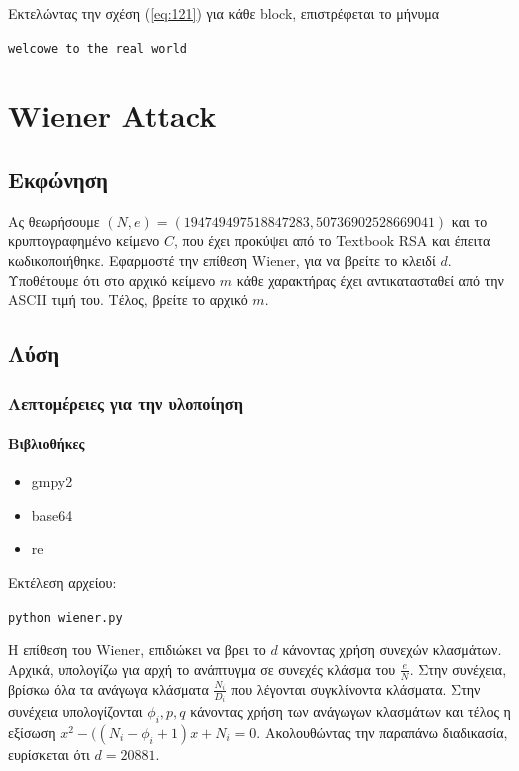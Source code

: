 \documentclass[oneside]{article}
\let\t\texttt
\begin{document}
Εκτελώντας την σχέση (\ref{eq:121}) για κάθε block, επιστρέφεται το μήνυμα

\begin{center}
    \t{welcowe to the real world}
\end{center}

\section{Wiener Attack}

\subsection{Εκφώνηση} 

Ας θεωρήσουμε $(N, e) = (194749497518847283, 50736902528669041)$ και το κρυπτογραφημένο κείμενο \href{https://github.com/drazioti/book_crypto/blob/master/public_key_crypto/7.2}{$C$}, που έχει προκύψει από το Textbook RSA και έπειτα κωδικοποιήθηκε. Εφαρμοστέ την επίθεση Wiener, για να βρείτε το κλειδί $d$. Υποθέτουμε ότι στο αρχικό κείμενο $m$ κάθε χαρακτήρας έχει αντικατασταθεί από την ASCII τιμή του. Τέλος, βρείτε το αρχικό $m$.

\subsection{Λύση}

\subsubsection{Λεπτομέρειες για την υλοποίηση}

\paragraph{Βιβλιοθήκες}

\begin{itemize}
    \item gmpy2
    \item base64
    \item re
\end{itemize}

Εκτέλεση αρχείου:

\begin{center}
    \t{python wiener.py}
\end{center}

Η επίθεση του Wiener, επιδιώκει να βρει το $d$ κάνοντας χρήση συνεχών κλασμάτων. 
Αρχικά, υπολογίζω για αρχή το ανάπτυγμα σε συνεχές κλάσμα του $\frac{e}{N}$. Στην συνέχεια, βρίσκω όλα τα ανάγωγα κλάσματα $\frac{N_i}{D_i}$ που λέγονται συγκλίνοντα κλάσματα. Στην συνέχεια υπολογίζονται $\phi_i, p, q$ κάνοντας χρήση των ανάγωγων κλασμάτων  και τέλος η εξίσωση $x^2 - ((N_i - \phi_i + 1)x + N_i = 0$.
Ακολουθώντας την παραπάνω διαδικασία, ευρίσκεται ότι $d = 20881$.
\end{document}

